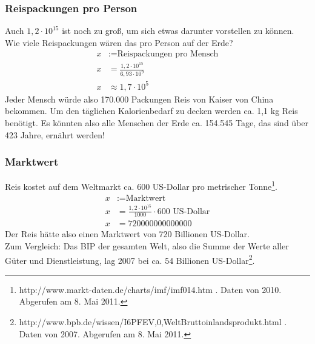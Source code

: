 \documentclass[a4paper,9pt]{scrartcl}
\begin{document}
  \subsubsection{Reispackungen pro Person}
    Auch $1,2 \cdot 10^{15}$ ist noch zu groß, um sich etwas darunter vorstellen 
    zu können.\\
    Wie viele Reispackungen wären das pro Person auf der Erde?\\
    \begin{align}
        x &:= \text{Reispackungen pro Mensch} \\
        x &= \frac{1,2 \cdot 10^{15}}{6,93 \cdot 10^9} \\
        x &\approx 1,7 \cdot 10^5
    \end{align}
    Jeder Mensch würde also 170.000 Packungen Reis von Kaiser von China bekommen.
    Um den täglichen Kalorienbedarf zu decken werden ca. 1,1 kg Reis benötigt.
    Es könnten also alle Menschen der Erde ca. 154.545 Tage, das sind über 423 
    Jahre, ernährt werden!\\
  \subsubsection{Marktwert}
    Reis kostet auf dem Weltmarkt ca. 600 US-Dollar pro metrischer Tonne\footnote{http://www.markt-daten.de/charts/imf/imf014.htm . Daten von 2010. Abgerufen am 8. Mai 2011.}.
    \begin{align}
        x &:= \text{Marktwert} \\
        x &= \frac{1,2 \cdot 10^{15}}{1000} \cdot 600 \text{ US-Dollar}\\
        x &= 720000000000000
    \end{align}
    Der Reis hätte also einen Marktwert von 720 Billionen US-Dollar. \\
    Zum Vergleich: Das BIP der
    gesamten Welt, also die Summe der Werte aller Güter und Dienstleistung, lag
    2007 bei ca. 54 Billionen US-Dollar\footnote{http://www.bpb.de/wissen/I6PFEV,0,WeltBruttoinlandsprodukt.html . Daten von 2007. Abgerufen am 8. Mai 2011.}.
\end{document}

